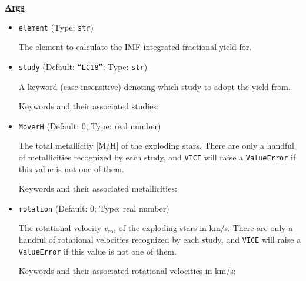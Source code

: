 \documentclass{report}
\begin{document}
\null\par\noindent 
\underline{\textbf{Args}}
\par\noindent 
\begin{itemize} 
	\item{
		\texttt{element} (Type: \texttt{str}) 
		\par
		The element to calculate the IMF-integrated fractional yield for. 
	}

	\item{
		\texttt{study} (Default: \texttt{``LC18''}; Type: \texttt{str}) 
		\par
		A keyword (case-insensitive) denoting which study to adopt the yield 
		from. 
		\par
		Keywords and their associated studies: 
	}

	\item{
		\texttt{MoverH} (Default: 0; Type: real number) 
		\par
		The total metallicity [M/H] of the exploding stars. There are only a 
		handful of metallicities recognized by each study, and \texttt{VICE} 
		will raise a \texttt{ValueError} if this value is not one of them. 
		\par
		Keywords and their associated metallicities: 
	}

	\item{
		\texttt{rotation} (Default: 0; Type: real number) 
		\par
		The rotational velocity $v_\text{rot}$ of the exploding stars in km/s. 
		There are only a handful of rotational velocities recognized by each 
		study, and \texttt{VICE} will raise a \texttt{ValueError} if this 
		value is not one of them. 
		\par 
		Keywords and their associated rotational velocities in km/s: 
	}


\end{itemize}
\end{document}

